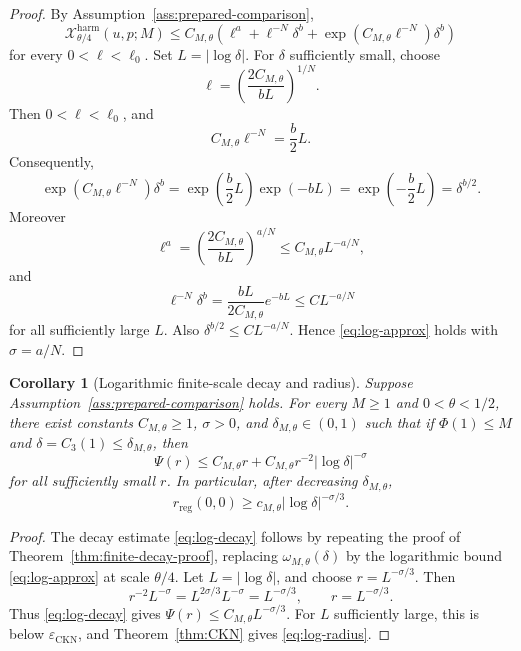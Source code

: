 \documentclass[pdflatex,sn-mathphys-num]{sn-jnl}
\numberwithin{equation}{section}
\theoremstyle{thmstyleone}
\newtheorem{corollary}[theorem]{Corollary}
\theoremstyle{thmstylethree}
\newcommand{\eps}{\varepsilon}
\newcommand{\reg}{\mathrm{reg}}
\newcommand{\CKN}{\mathrm{CKN}}
\newcommand{\calX}{\mathcal X}
\newcommand{\harm}{\mathrm{harm}}
\begin{document}
\begin{proof}
By Assumption~\ref{ass:prepared-comparison},
\[
        \calX^{\harm}_{\theta/4}(u,p;M)
        \le C_{M,\theta}\left(\ell^a+\ell^{-N}\delta^b+\exp(C_{M,\theta}\ell^{-N})\delta^b\right)
\]
for every \(0<\ell<\ell_0\).  Set \(L=|\log\delta|\).  For \(\delta\) sufficiently small, choose
\[
        \ell=\left(\frac{2C_{M,\theta}}{bL}\right)^{1/N}.
\]
Then \(0<\ell<\ell_0\), and
\[
        C_{M,\theta}\ell^{-N}=\frac b2L.
\]
Consequently,
\[
        \exp(C_{M,\theta}\ell^{-N})\delta^b
        =\exp\left(\frac b2L\right)\exp(-bL)
        =\exp\left(-\frac b2L\right)
        =\delta^{b/2}.
\]
Moreover
\[
        \ell^a
        =\left(\frac{2C_{M,\theta}}{bL}\right)^{a/N}
        \le C_{M,\theta}L^{-a/N},
\]
and
\[
        \ell^{-N}\delta^b
        =\frac{bL}{2C_{M,\theta}}e^{-bL}
        \le C L^{-a/N}
\]
for all sufficiently large \(L\).  Also \(\delta^{b/2}\le C L^{-a/N}\).  Hence \eqref{eq:log-approx} holds with \(\sigma=a/N\).
\end{proof}

\begin{corollary}[Logarithmic finite-scale decay and radius]
\label{cor:log-decay}
Suppose Assumption~\ref{ass:prepared-comparison} holds.  For every \(M\ge1\) and \(0<\theta<1/2\), there exist constants \(C_{M,\theta}\ge1\), \(\sigma>0\), and \(\delta_{M,\theta}\in(0,1)\) such that if \(\Phi(1)\le M\) and \(\delta=C_3(1)\le\delta_{M,\theta}\), then
\begin{equation}
        \Psi(r)
        \le C_{M,\theta}r+C_{M,\theta}r^{-2}|\log\delta|^{-\sigma}
        \label{eq:log-decay}
\end{equation}
for all sufficiently small \(r\).  In particular, after decreasing \(\delta_{M,\theta}\),
\begin{equation}
        r_{\reg}(0,0)
        \ge c_{M,\theta}|\log\delta|^{-\sigma/3}.
        \label{eq:log-radius}
\end{equation}
\end{corollary}

\begin{proof}
The decay estimate \eqref{eq:log-decay} follows by repeating the proof of Theorem~\ref{thm:finite-decay-proof}, replacing \(\omega_{M,\theta}(\delta)\) by the logarithmic bound \eqref{eq:log-approx} at scale \(\theta/4\).  Let \(L=|\log\delta|\), and choose \(r=L^{-\sigma/3}\).  Then
\[
        r^{-2}L^{-\sigma}=L^{2\sigma/3}L^{-\sigma}=L^{-\sigma/3},
        \qquad
        r=L^{-\sigma/3}.
\]
Thus \eqref{eq:log-decay} gives \(\Psi(r)\le C_{M,\theta}L^{-\sigma/3}\).  For \(L\) sufficiently large, this is below \(\eps_{\CKN}\), and Theorem~\ref{thm:CKN} gives \eqref{eq:log-radius}.
\end{proof}
\end{document}
